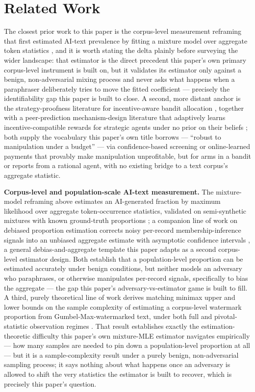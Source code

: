 \documentclass[11pt]{article}
\begin{document}
\section{Related Work}

The closest prior work to this paper is the corpus-level measurement reframing that first estimated AI-text prevalence by fitting a mixture model over aggregate token statistics \citep{MonitorAIScale}, and it is worth stating the delta plainly before surveying the wider landscape: that estimator is the direct precedent this paper's own primary corpus-level instrument is built on, but it validates its estimator only against a benign, non-adversarial mixing process and never asks what happens when a paraphraser deliberately tries to move the fitted coefficient --- precisely the identifiability gap this paper is built to close. A second, more distant anchor is the strategy-proofness literature for incentive-aware bandit allocation \citep{UCBS}, together with a peer-prediction mechanism-design literature that adaptively learns incentive-compatible rewards for strategic agents under no prior on their beliefs \citep{MultiAgentMechDesign2025}; both supply the vocabulary this paper's own title borrows --- ``robust to manipulation under a budget'' --- via confidence-based screening or online-learned payments that provably make manipulation unprofitable, but for arms in a bandit or reports from a rational agent, with no existing bridge to a text corpus's aggregate statistic.

\textbf{Corpus-level and population-scale AI-text measurement.} The mixture-model reframing above estimates an AI-generated fraction by maximum likelihood over aggregate token-occurrence statistics, validated on semi-synthetic mixtures with known ground-truth proportions \citep{MonitorAIScale}; a companion line of work on debiased proportion estimation corrects noisy per-record membership-inference signals into an unbiased aggregate estimate with asymptotic confidence intervals \citep{DUCI}, a general debias-and-aggregate template this paper adapts as a second corpus-level estimator design. Both establish that a population-level proportion can be estimated accurately under benign conditions, but neither models an adversary who paraphrases, or otherwise manipulates per-record signals, specifically to bias the aggregate --- the gap this paper's adversary-vs-estimator game is built to fill. A third, purely theoretical line of work derives matching minimax upper and lower bounds on the sample complexity of estimating a corpus-level watermark proportion from Gumbel-Max-watermarked text, under both full and pivotal-statistic observation regimes \citep{GumbelWatermarkSampleComplexity2026}. That result establishes exactly the estimation-theoretic difficulty this paper's own mixture-MLE estimator navigates empirically --- how many samples are needed to pin down a population-level proportion at all --- but it is a sample-complexity result under a purely benign, non-adversarial sampling process; it says nothing about what happens once an adversary is allowed to shift the very statistics the estimator is built to recover, which is precisely this paper's question.
\end{document}

